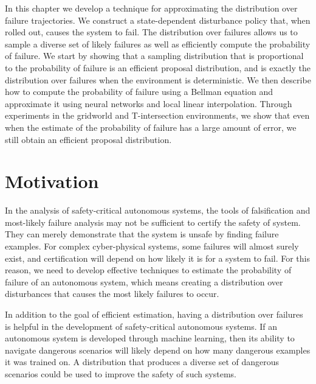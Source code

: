 In this chapter we develop a technique for approximating the distribution over failure trajectories. We construct a state-dependent disturbance policy that, when rolled out, causes the system to fail. The distribution over failures allows us to sample a diverse set of likely failures as well as efficiently compute the probability of failure. We start by showing that a sampling distribution that is proportional to the probability of failure is an efficient proposal distribution, and is exactly the distribution over failures when the environment is deterministic. We then describe how to compute the probability of failure using a Bellman equation and approximate it using neural networks and local linear interpolation. Through experiments in the gridworld and T-intersection environments, we show that even when the estimate of the probability of failure has a large amount of error, we still obtain an efficient proposal distribution.

\section{Motivation}

In the analysis of safety-critical autonomous systems, the tools of falsification and most-likely failure analysis may not be sufficient to certify the safety of system. They can merely demonstrate that the system is unsafe by finding failure examples. For complex cyber-physical systems, some failures will almost surely exist, and certification will depend on how likely it is for a system to fail. For this reason, we need to develop effective techniques to estimate the probability of failure of an autonomous system, which means creating a distribution over disturbances that causes the most likely failures to occur. 

In addition to the goal of efficient estimation, having a distribution over failures is helpful in the development of safety-critical autonomous systems. If an autonomous system is developed through machine learning, then its ability to navigate dangerous scenarios will likely depend on how many dangerous examples it was trained on. A distribution that produces a diverse set of dangerous scenarios could be used to improve the safety of such systems. 

